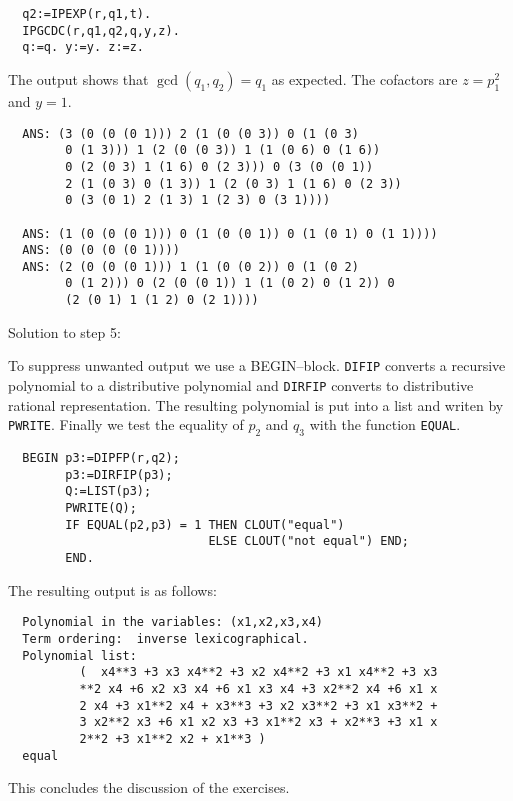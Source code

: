 {\footnotesize
\begin{verbatim}
  q2:=IPEXP(r,q1,t). 
  IPGCDC(r,q1,q2,q,y,z).
  q:=q. y:=y. z:=z.
\end{verbatim}
}

The output shows that $\gcd(q_1,q_2) = q_1$ as
expected. The cofactors are $z = p_1^2$ and
$y = 1$.

{\footnotesize
\begin{verbatim}
  ANS: (3 (0 (0 (0 1))) 2 (1 (0 (0 3)) 0 (1 (0 3) 
        0 (1 3))) 1 (2 (0 (0 3)) 1 (1 (0 6) 0 (1 6)) 
        0 (2 (0 3) 1 (1 6) 0 (2 3))) 0 (3 (0 (0 1)) 
        2 (1 (0 3) 0 (1 3)) 1 (2 (0 3) 1 (1 6) 0 (2 3)) 
        0 (3 (0 1) 2 (1 3) 1 (2 3) 0 (3 1))))

  ANS: (1 (0 (0 (0 1))) 0 (1 (0 (0 1)) 0 (1 (0 1) 0 (1 1))))
  ANS: (0 (0 (0 (0 1))))
  ANS: (2 (0 (0 (0 1))) 1 (1 (0 (0 2)) 0 (1 (0 2) 
        0 (1 2))) 0 (2 (0 (0 1)) 1 (1 (0 2) 0 (1 2)) 0 
        (2 (0 1) 1 (1 2) 0 (2 1))))
\end{verbatim}
}

Solution to step 5:

To suppress unwanted output we use a BEGIN--block.
\verb/DIFIP/ converts a recursive polynomial to 
a distributive polynomial and \verb/DIRFIP/ converts  
to distributive rational representation. 
The resulting polynomial is put into a list 
and writen by \verb/PWRITE/. 
Finally we test the equality of 
$p_2$ and $q_3$ with the function \verb/EQUAL/. 

{\footnotesize
\begin{verbatim}
  BEGIN p3:=DIPFP(r,q2);
        p3:=DIRFIP(p3);
        Q:=LIST(p3);
        PWRITE(Q); 
        IF EQUAL(p2,p3) = 1 THEN CLOUT("equal") 
                            ELSE CLOUT("not equal") END;
        END.
\end{verbatim}
}

The resulting output is as follows:

{\footnotesize
\begin{verbatim}
  Polynomial in the variables: (x1,x2,x3,x4)
  Term ordering:  inverse lexicographical.
  Polynomial list: 
          (  x4**3 +3 x3 x4**2 +3 x2 x4**2 +3 x1 x4**2 +3 x3
          **2 x4 +6 x2 x3 x4 +6 x1 x3 x4 +3 x2**2 x4 +6 x1 x
          2 x4 +3 x1**2 x4 + x3**3 +3 x2 x3**2 +3 x1 x3**2 +
          3 x2**2 x3 +6 x1 x2 x3 +3 x1**2 x3 + x2**3 +3 x1 x
          2**2 +3 x1**2 x2 + x1**3 ) 
  equal
\end{verbatim}
}

This concludes the discussion of the 
exercises. 


